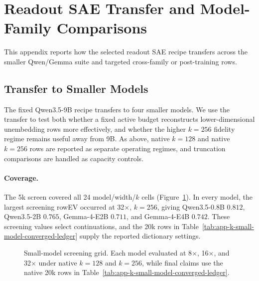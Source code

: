 
\section{Readout SAE Transfer and Model-Family Comparisons}
\label{app:readout-factorizer-transfer-comparisons}

This appendix reports how the selected readout SAE recipe transfers across the
smaller Qwen/Gemma suite and targeted cross-family or post-training rows.

\subsection{Transfer to Smaller Models}
\label{app:readout-factorizer-small-model-transfer}

The fixed Qwen3.5-9B recipe transfers to four smaller models. We use the
transfer to test both whether a fixed active budget reconstructs
lower-dimensional unembedding rows more effectively, and whether the higher
$k=256$ fidelity regime remains useful away from 9B. As above, native $k=128$
and native $k=256$ rows are reported as separate operating regimes, and truncation
comparisons are handled as capacity controls.

\paragraph{Coverage.}
The 5k screen covered all 24 model/width/$k$ cells
(Figure~\ref{fig:app-k-small-model-pilot-grid}). In every model, the largest
screening rowEV occurred at 32$\times$, $k=256$, giving Qwen3.5-0.8B $0.812$,
Qwen3.5-2B $0.765$, Gemma-4-E2B $0.711$, and Gemma-4-E4B $0.742$. These screening
values select continuations, and the 20k rows in
Table~\ref{tab:app-k-small-model-converged-ledger} supply the reported
dictionary settings.

\begin{figure}[!tbp]
    \centering
    \caption{
        Small-model screening grid. Each model evaluated at 8$\times$,
        16$\times$, and 32$\times$ under native $k=128$ and $k=256$, while final
        claims use the native 20k rows in
        Table~\ref{tab:app-k-small-model-converged-ledger}.
    }
    \label{fig:app-k-small-model-pilot-grid}
\end{figure}

